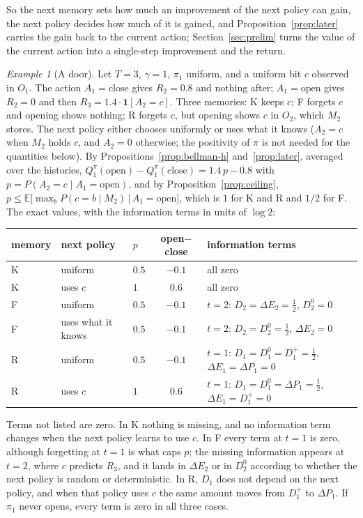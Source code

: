 \documentclass{article}
\theoremstyle{definition}
\theoremstyle{remark}
\newtheorem{example}[proposition]{Example}
\newcommand{\E}{\mathbb{E}}
\newcommand{\dE}{\Delta E}
\newcommand{\dP}{\Delta P}
\begin{document}
So the next memory sets how much an improvement of the next policy can gain, the next policy decides how much of it is gained, and Proposition~\ref{prop:later} carries the gain back to the current action; Section~\ref{sec:prelim} turns the value of the current action into a single-step improvement and the return.

\begin{example}[A door]\label{ex:door}
Let $T=3$, $\gamma=1$, $\pi_1$ uniform, and a uniform bit $c$ observed in $O_1$. The action $A_1=\text{close}$ gives $R_2=0.8$ and nothing after; $A_1=\text{open}$ gives $R_2=0$ and then $R_3=1.4\cdot\mathbf 1[A_2=c]$. Three memories: K keeps $c$; F forgets $c$ and opening shows nothing; R forgets $c$, but opening shows $c$ in $O_2$, which $M_2$ stores. The next policy either chooses uniformly or uses what it knows ($A_2=c$ when $M_2$ holds $c$, and $A_2=0$ otherwise; the positivity of $\pi$ is not needed for the quantities below). By Propositions~\ref{prop:bellman-h} and~\ref{prop:later}, averaged over the histories, $Q^\pi_1(\text{open})-Q^\pi_1(\text{close})=1.4\,p-0.8$ with $p=P(A_2=c\mid A_1=\text{open})$, and by Proposition~\ref{prop:ceiling}, $p\le\E\big[\max_bP(c=b\mid M_2)\,\big|\,A_1=\text{open}\big]$, which is $1$ for K and R and $1/2$ for F. The exact values, with the information terms in units of $\log2$:
\begin{center}
\small
\begin{tabular}{lllcl}
\toprule
memory & next policy & $p$ & open$-$close & information terms \\
\midrule
K & uniform & $0.5$ & $-0.1$ & all zero \\
K & uses $c$ & $1$ & $0.6$ & all zero \\
F & uniform & $0.5$ & $-0.1$ & $t=2$: $D_2=\dE_2=\tfrac12$, $D^0_2=0$ \\
F & uses what it knows & $0.5$ & $-0.1$ & $t=2$: $D_2=D^0_2=\tfrac12$, $\dE_2=0$ \\
R & uniform & $0.5$ & $-0.1$ & $t=1$: $D_1=D^0_1=D^+_1=\tfrac12$, $\dE_1=\dP_1=0$ \\
R & uses $c$ & $1$ & $0.6$ & $t=1$: $D_1=D^0_1=\dP_1=\tfrac12$, $\dE_1=D^+_1=0$ \\
\bottomrule
\end{tabular}
\end{center}
Terms not listed are zero. In K nothing is missing, and no information term changes when the next policy learns to use $c$. In F every term at $t=1$ is zero, although forgetting at $t=1$ is what caps $p$; the missing information appears at $t=2$, where $c$ predicts $R_3$, and it lands in $\dE_2$ or in $D^0_2$ according to whether the next policy is random or deterministic. In R, $D_1$ does not depend on the next policy, and when that policy uses $c$ the same amount moves from $D^+_1$ to $\dP_1$. If $\pi_1$ never opens, every term is zero in all three cases.
\end{example}
\end{document}
